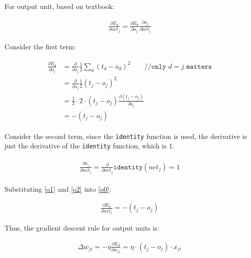 \documentclass[preview]{standalone}
\begin{document}
For output unit, based on textbook:

\begin{align}
\label{o0}
\frac{\partial E_d}{\partial net_j}=\frac{\partial E_d}{\partial o_j}\frac{\partial o_j}{\partial net_j}
\end{align}

Consider the first term:

\begin{align}
\label{o1}
\begin{split}
\frac{\partial E_d}{\partial o_j}
&=\frac{\partial}{\partial o_j}\frac{1}{2}\sum_d(t_d-o_d)^2\qquad\texttt{//only $d = j$ matters}\\
&=\frac{\partial}{\partial o_j}\frac{1}{2}(t_j-o_j)^2\\
&=\frac{1}{2} \cdot 2 \cdot (t_j-o_j)\frac{\partial(t_j-o_j)}{\partial o_j}\\
&=-(t_j-o_j)
\end{split}
\end{align}

Consider the second term, since the \texttt{identity} function is used, the
derivative is just the derivative of the \texttt{identity} function, which is
$1$.

\begin{align}
\label{o2}
\begin{split}
\frac{\partial o_j}{\partial net_j}=\frac{\partial}{\partial net_j}\mathtt{identity}(net_j) = 1
\end{split}
\end{align}

Substituting \cref{o1} and \cref{o2} into \cref{o0}:

\begin{align}
    \frac{\partial E_d}{\partial net_j}=-(t_j-o_j)
\end{align}

Thus, the gradient descent rule for output units is:

\begin{align}
\Delta w_{ji} = -\eta\frac{\partial E_d}{\partial w_{ji}} = \eta \cdot
(t_j-o_j) \cdot x_{ji}
\end{align}
\end{document}
